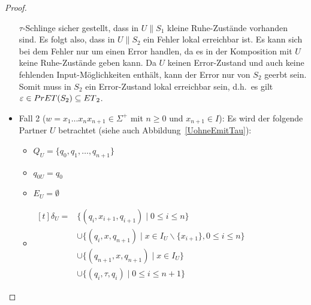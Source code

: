 \begin{proof}
\begin{itemize}
      $\tau$-Schlinge sicher gestellt, dass in $U\|S_1$ kleine Ruhe-Zustände
      vorhanden sind. Es folgt also, dass in $U\|S_2$ ein Fehler lokal
      erreichbar ist. Es kann sich bei dem Fehler nur um einen Error handlen,
      da es in der Komposition mit $U$ keine Ruhe-Zustände geben kann. Da $U$
      keinen Error-Zustand und auch keine fehlenden Input-Möglichkeiten
      enthält, kann der Error nur von $S_2$ geerbt sein. Somit muss in $S_2$
      ein Error-Zustand lokal erreichbar sein, d.h.\ es gilt $\varepsilon\in
      PrET{}(S_2)\subseteq ET{}_2$.
    \item Fall 2 ($w=x_1\dots x_nx_{n+1}\in\Sigma ^+$ mit $n\geq 0$ und
      $x_{n+1}\in I$): Es wird der folgende Partner $U$ betrachtet (siehe auch
      Abbildung~\ref{UohneEmitTau}):
      \begin{itemize}
        \item $Q_U=\{q_0,q_1,\dots ,q_{n+1}\}$
        \item $q_{0U}=q_0$
        \item $E_U=\emptyset$
        \item $\begin{aligned}[t]
            \delta _U=&\{(q_i,x_{i+1},q_{i+1})\mid  0\leq i\leq n\}\\
                      &\cup\{(q_i,x,q_{n+1})\mid  x\in I_U\backslash\{x_{i+1}\},
          0\leq i\leq n\}\\
          &\cup\{(q_{n+1},x,q_{n+1})\mid  x\in I_U\}\\
          &\cup\{(q_i,\tau,q_i)\mid 0\leq i\leq n+1\}
        \end{aligned}$
      \end{itemize}
      \begin{figure} [h!tbp]
      \begin{center}
\end{center}
\end{figure}
\end{itemize}
\end{proof}

